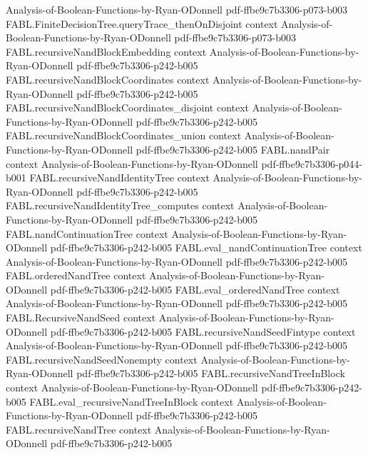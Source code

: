 \begin{theorem}
  {Analysis-of-Boolean-Functions-by-Ryan-ODonnell}
  {pdf-ffbe9c7b3306-p073-b003}
\proofstep
  {FABL.FiniteDecisionTree.queryTrace_thenOnDisjoint}
  {context}
  {Analysis-of-Boolean-Functions-by-Ryan-ODonnell}
  {pdf-ffbe9c7b3306-p073-b003}
\proofstep
  {FABL.recursiveNandBlockEmbedding}
  {context}
  {Analysis-of-Boolean-Functions-by-Ryan-ODonnell}
  {pdf-ffbe9c7b3306-p242-b005}
\proofstep
  {FABL.recursiveNandBlockCoordinates}
  {context}
  {Analysis-of-Boolean-Functions-by-Ryan-ODonnell}
  {pdf-ffbe9c7b3306-p242-b005}
\proofstep
  {FABL.recursiveNandBlockCoordinates_disjoint}
  {context}
  {Analysis-of-Boolean-Functions-by-Ryan-ODonnell}
  {pdf-ffbe9c7b3306-p242-b005}
\proofstep
  {FABL.recursiveNandBlockCoordinates_union}
  {context}
  {Analysis-of-Boolean-Functions-by-Ryan-ODonnell}
  {pdf-ffbe9c7b3306-p242-b005}
\proofstep
  {FABL.nandPair}
  {context}
  {Analysis-of-Boolean-Functions-by-Ryan-ODonnell}
  {pdf-ffbe9c7b3306-p044-b001}
\proofstep
  {FABL.recursiveNandIdentityTree}
  {context}
  {Analysis-of-Boolean-Functions-by-Ryan-ODonnell}
  {pdf-ffbe9c7b3306-p242-b005}
\proofstep
  {FABL.recursiveNandIdentityTree_computes}
  {context}
  {Analysis-of-Boolean-Functions-by-Ryan-ODonnell}
  {pdf-ffbe9c7b3306-p242-b005}
\proofstep
  {FABL.nandContinuationTree}
  {context}
  {Analysis-of-Boolean-Functions-by-Ryan-ODonnell}
  {pdf-ffbe9c7b3306-p242-b005}
\proofstep
  {FABL.eval_nandContinuationTree}
  {context}
  {Analysis-of-Boolean-Functions-by-Ryan-ODonnell}
  {pdf-ffbe9c7b3306-p242-b005}
\proofstep
  {FABL.orderedNandTree}
  {context}
  {Analysis-of-Boolean-Functions-by-Ryan-ODonnell}
  {pdf-ffbe9c7b3306-p242-b005}
\proofstep
  {FABL.eval_orderedNandTree}
  {context}
  {Analysis-of-Boolean-Functions-by-Ryan-ODonnell}
  {pdf-ffbe9c7b3306-p242-b005}
\proofstep
  {FABL.RecursiveNandSeed}
  {context}
  {Analysis-of-Boolean-Functions-by-Ryan-ODonnell}
  {pdf-ffbe9c7b3306-p242-b005}
\proofstep
  {FABL.recursiveNandSeedFintype}
  {context}
  {Analysis-of-Boolean-Functions-by-Ryan-ODonnell}
  {pdf-ffbe9c7b3306-p242-b005}
\proofstep
  {FABL.recursiveNandSeedNonempty}
  {context}
  {Analysis-of-Boolean-Functions-by-Ryan-ODonnell}
  {pdf-ffbe9c7b3306-p242-b005}
\proofstep
  {FABL.recursiveNandTreeInBlock}
  {context}
  {Analysis-of-Boolean-Functions-by-Ryan-ODonnell}
  {pdf-ffbe9c7b3306-p242-b005}
\proofstep
  {FABL.eval_recursiveNandTreeInBlock}
  {context}
  {Analysis-of-Boolean-Functions-by-Ryan-ODonnell}
  {pdf-ffbe9c7b3306-p242-b005}
\proofstep
  {FABL.recursiveNandTree}
  {context}
  {Analysis-of-Boolean-Functions-by-Ryan-ODonnell}
  {pdf-ffbe9c7b3306-p242-b005}

\end{theorem}
